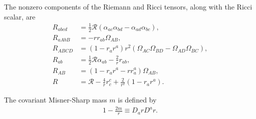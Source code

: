 \documentclass[12pt]{report}
\begin{document}
The nonzero components of the Riemann and Ricci tensors, along
with the Ricci scalar, are 
\begin{subequations}
\label{eq:riemann_ricci_spherical_sym}
\begin{align}
    R_{abcd}
    &=
    \frac{1}{2}
    \mathcal{R}
    \left(
        \alpha_{ac}\alpha_{bd}
        -
        \alpha_{ad}\alpha_{bc}
    \right)
    ,\\
    R_{aAbB}
    &=
    -
    r
    r_{ab}
    \Omega_{AB}
    ,\\
    R_{ABCD}
    &=
    \left(
        1
        -
        r_ar^a
    \right)
    r^2
    \left(
        \Omega_{AC}\Omega_{BD}
        -
        \Omega_{AD}\Omega_{BC}
    \right)
    ,\\
    R_{ab}
    &=
    \frac{1}{2}\mathcal{R}\alpha_{ab}
    -
    \frac{2}{r}r_{ab}
    ,\\
    R_{AB}
    &=
    \left(
        1
        -
        r_ar^a 
        -
        r r_a^a
    \right)
    \Omega_{AB}
    ,\\
    R
    &=
    \mathcal{R}
    -
    \frac{4}{r}r_c^c
    +
    \frac{2}{r^2}\left(1-r_ar^a\right)
    .
\end{align}
\end{subequations}

The covariant Misner-Sharp mass $m$ is defined by
\begin{align}
\label{eq:covariant_ms}
    \boxed{
        1
        -
        \frac{2m}{r}
        \equiv
        D_arD^ar
        .
    }
\end{align}
\end{document}
